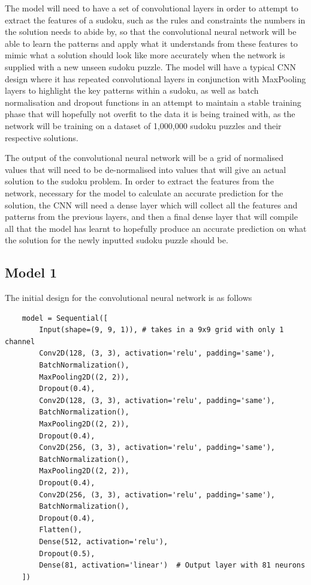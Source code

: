 \documentclass[]{final_report}
\begin{document}
The model will need to have a set of convolutional layers in order to attempt to extract the features of a sudoku, such as the rules and constraints the numbers in the solution needs to abide by, so that the convolutional neural network will be able to learn the patterns and apply what it understands from these features to mimic what a solution should look like more accurately when the network is supplied with a new unseen sudoku puzzle. The model will have a typical CNN design where it has repeated convolutional layers in conjunction with MaxPooling layers to highlight the key patterns within a sudoku, as well as batch normalisation and dropout functions in an attempt to maintain a stable training phase that will hopefully not overfit to the data it is being trained with, as the network will be training on a dataset of 1,000,000 sudoku puzzles and their respective solutions. 

The output of the convolutional neural network will be a grid of normalised values that will need to be de-normalised into values that will give an actual solution to the sudoku problem. In order to extract the features from the network, necessary for the model to calculate an accurate prediction for the solution, the CNN will need a dense layer which will collect all the features and patterns from the previous layers, and then a final dense layer that will compile all that the model has learnt to hopefully produce an accurate prediction on what the solution for the newly inputted sudoku puzzle should be. 

\subsection{Model 1}

The initial design for the convolutional neural network is as follows 

\begin{verbatim}
    model = Sequential([
        Input(shape=(9, 9, 1)), # takes in a 9x9 grid with only 1 channel
        Conv2D(128, (3, 3), activation='relu', padding='same'),
        BatchNormalization(),
        MaxPooling2D((2, 2)),
        Dropout(0.4),
        Conv2D(128, (3, 3), activation='relu', padding='same'),
        BatchNormalization(),
        MaxPooling2D((2, 2)),
        Dropout(0.4),
        Conv2D(256, (3, 3), activation='relu', padding='same'),
        BatchNormalization(),
        MaxPooling2D((2, 2)),
        Dropout(0.4),
        Conv2D(256, (3, 3), activation='relu', padding='same'),
        BatchNormalization(),
        Dropout(0.4),
        Flatten(),
        Dense(512, activation='relu'),
        Dropout(0.5),
        Dense(81, activation='linear')  # Output layer with 81 neurons
    ])
\end{verbatim}
\end{document}
